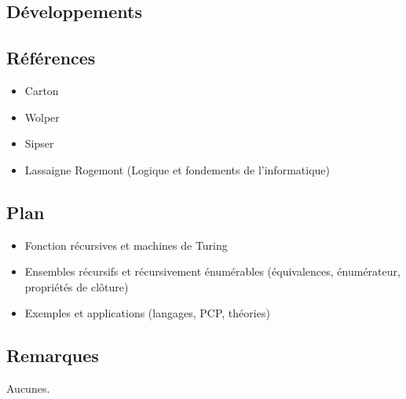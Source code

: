 \documentclass[../../agregation.tex]{subfiles}
\begin{document}

\subsection{Développements}

\dvts

\subsection{Références}

\begin{itemize}
	\item Carton
	\item Wolper
	\item Sipser
	\item Lassaigne Rogemont (Logique et fondements de l'informatique)
	
\end{itemize}

\subsection{Plan}

\begin{itemize}
	\item Fonction récursives et machines de Turing
	\item Ensembles récursifs et récursivement énumérables (équivalences, énumérateur, propriétés de clôture)
	\item Exemples et applications (langages, PCP, théories)
\end{itemize}

\subsection{Remarques}

Aucunes.
\end{document}
